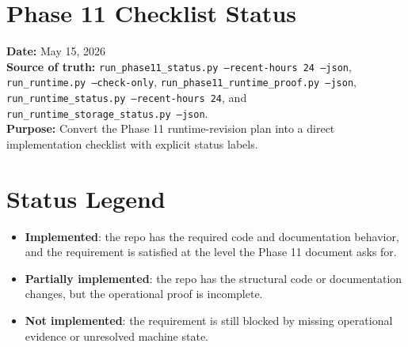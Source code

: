 \documentclass{article}
\begin{document}
\section*{Phase 11 Checklist Status}

\textbf{Date:} May 15, 2026\\
\textbf{Source of truth:} \texttt{run\_phase11\_status.py --recent-hours 24 --json}, \texttt{run\_runtime.py --check-only}, \texttt{run\_phase11\_runtime\_proof.py --json}, \texttt{run\_runtime\_status.py --recent-hours 24}, and \texttt{run\_runtime\_storage\_status.py --json}.\\
\textbf{Purpose:} Convert the Phase 11 runtime-revision plan into a direct implementation checklist with explicit status labels.

\section*{Status Legend}
\begin{itemize}
\item \textbf{Implemented}: the repo has the required code and documentation behavior, and the requirement is satisfied at the level the Phase 11 document asks for.
\item \textbf{Partially implemented}: the repo has the structural code or documentation changes, but the operational proof is incomplete.
\item \textbf{Not implemented}: the requirement is still blocked by missing operational evidence or unresolved machine state.
\end{itemize}
\end{document}
